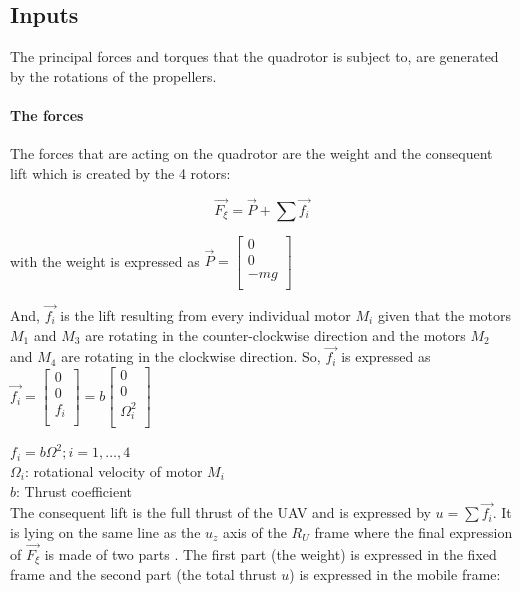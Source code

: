 \documentclass{thesisreport}
\begin{document}
\subsection{Inputs}

The principal forces and torques that the quadrotor is subject to, are generated by the rotations of the propellers. 

\paragraph{The forces} The forces that are acting on the quadrotor are the weight and the consequent lift which is created by the 4 rotors:

\begin{equation}
\overrightarrow{F_{\xi}}= \overrightarrow{P} + \sum \overrightarrow{f_i}
\end{equation} 

with the weight is expressed as 
$ \overrightarrow{P}= \begin{bmatrix}
0 \\ 
0 \\
-mg \\
\end{bmatrix}$

And, $\overrightarrow{f_{i}}$ is the lift resulting from every individual motor $M_i$ given that the motors $M_1$ and $M_3$ are rotating in the counter-clockwise direction and the motors $M_2$ and $M_4$ are rotating in the clockwise direction. So, $\overrightarrow{f_i}$ is expressed as $\overrightarrow{f_i}=\begin{bmatrix}
0 \\ 
0 \\
f_i \\
\end{bmatrix}=b \begin{bmatrix}
0 \\ 
0 \\
\Omega_i^2 \\
\end{bmatrix} $  

$f_i = b \Omega^2; i=1,\ldots,4$\\
$\Omega_i$: rotational velocity of motor $M_i$\\
$b$: Thrust coefficient\\

The consequent lift is the full thrust of the UAV and is expressed by $u=\sum \overrightarrow{f_i}$. It is lying on the same line as the $u_z$ axis of the $R_U$ frame where the final expression of $\overrightarrow{F_{\xi}}$ is made of two parts . The first part (the weight)  is expressed in the fixed frame and the second part (the total thrust $u$) is expressed in the mobile frame: 
\end{document}
